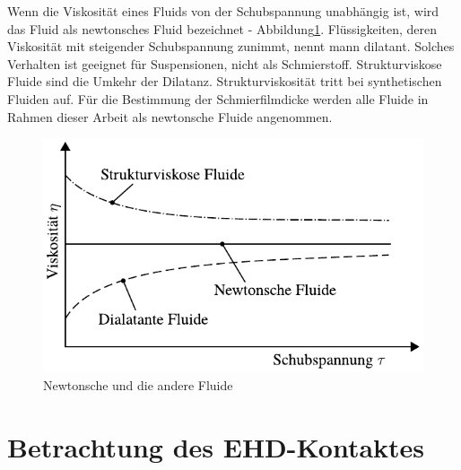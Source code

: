 Wenn die Viskosität eines Fluids von der Schubspannung unabhängig ist, wird das Fluid als newtonsches Fluid bezeichnet - Abbildung\ref{fig:newtonsche_fluide}.
Flüssigkeiten, deren Viskosität mit steigender Schubspannung zunimmt, nennt mann dilatant.
Solches Verhalten ist geeignet für Suspensionen, nicht als Schmierstoff.
Strukturviskose Fluide sind die Umkehr der Dilatanz.
Strukturviskosität tritt bei synthetischen Fluiden auf.
Für die Bestimmung der Schmierfilmdicke werden alle Fluide in Rahmen dieser Arbeit als newtonsche Fluide angenommen.
\begin{figure}[htb]
    \centering
    \includegraphics[]{./images/newtonsche_nichtnewtonsche_fluide.pdf}
    \caption{Newtonsche und die andere Fluide\cite{wisniewski}}
    \label{fig:newtonsche_fluide}
\end{figure}
%

\section{Betrachtung des EHD-Kontaktes}
\label{sec:betrachtung_des_ehd_kontaktes}

